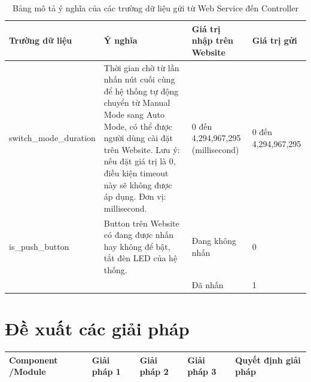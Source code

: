 {\begin{table}[H]
\centering
\small
\begin{tabular}{|p{4cm}|p{5cm}|p{2.5cm}|p{3.5cm}|}
\hline
{\textbf{Trường dữ liệu}}            & {\textbf{Ý nghĩa}}                                                                                                                                                                                                                              & {\textbf{Giá trị nhập trên Website}} & {\textbf{Giá trị gửi}} \\ \hline
{switch\_mode\_duration}             & {Thời gian chờ từ lần nhấn nút cuối cùng để hệ thống tự động chuyển từ Manual Mode sang Auto Mode, có thể được người dùng cài đặt trên Website. Lưu ý: nếu đặt giá trị là 0, điều kiện timeout này sẽ không được áp dụng. Đơn vị: millisecond.} & {0 đến 4,294,967,295 (millisecond)}       & {0 đến 4,294,967,295}  \\ \hline

\multirow{-2}{*}[-0.25cm]{{is\_push\_button}} & {{Button trên Website có đang được nhấn hay không để bật, tắt đèn LED của hệ thống.}}                                                                                                                                           & {Đang không nhấn}                         & {0}                   \\ \cline{3-4}  {}                                   & {}                                                                                                                                                                                                                                              & {Đã nhấn}                                 & {1}                    
\\ \hline
\end{tabular}
\caption{Bảng mô tả ý nghĩa của các trường dữ liệu gửi từ Web Service đến Controller}
\label{tab:my_label}

\end{table}

\pagebreak
\section{Đề xuất các giải pháp}
{%
\centering
\small
\begin{longtable}{|p{2.3cm}|p{3.2cm}|p{3.2cm}|p{3.2cm}|p{3.5cm}|}
\hline
\textbf{Component /Module} & \textbf{Giải pháp 1} & \textbf{Giải pháp 2} & \textbf{Giải pháp 3} & \textbf{Quyết định giải pháp} \\ \hline
\endfirsthead


\end{longtable}}}

